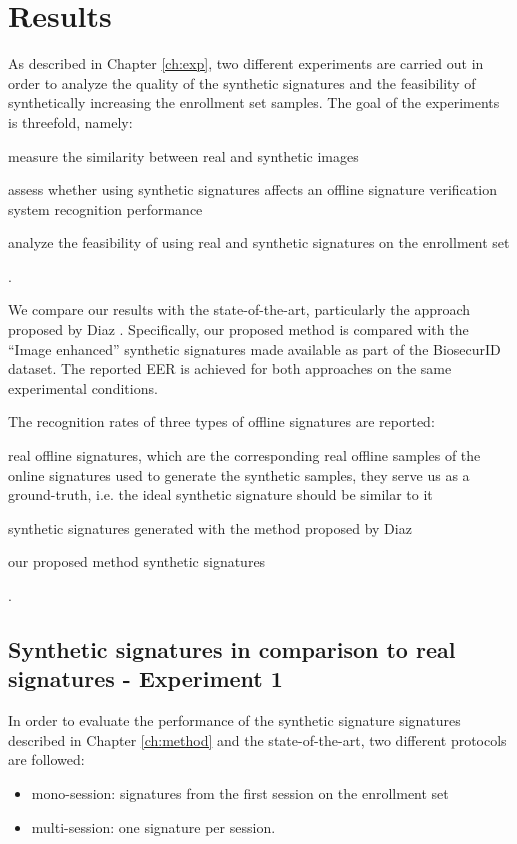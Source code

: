 
\chapter{Results} \label{ch:results}

As described in Chapter \ref{ch:exp}, two different experiments are
carried out in order to analyze the quality of the synthetic
signatures and the feasibility of synthetically increasing the
enrollment set samples. The goal of the experiments is threefold, namely:
\begin{inlinelist}
  \item measure the similarity between real
  and synthetic images
  \item assess whether using synthetic
  signatures affects an offline signature verification system recognition performance
  \item analyze the feasibility of using real and synthetic signatures
  on the enrollment set
\end{inlinelist}.

We compare our results with the state-of-the-art, particularly the approach proposed by Diaz \cite{diaz2014generation}. Specifically, our proposed method is compared with the ``Image enhanced'' synthetic signatures made available as part of the BiosecurID \cite{biosecurid} dataset. The reported EER is achieved for both approaches on the same experimental conditions.

The recognition rates of three types of offline signatures are reported: 
\begin{inlinelist}
  \item real offline signatures, which are the corresponding real offline samples of the online signatures used to generate the synthetic samples, they serve us as a ground-truth, i.e. the ideal synthetic signature should be similar to it
  \item synthetic signatures generated with the method proposed by Diaz \cite{diaz2014generation}
  \item our proposed method synthetic signatures
\end{inlinelist}.

\section{Synthetic signatures in comparison to real signatures - Experiment 1}
In order to evaluate the performance of the synthetic signature signatures described in Chapter \ref{ch:method} and the state-of-the-art, two different protocols are followed: 
\begin{itemize}
\item mono-session: signatures from the first session on the enrollment set
\item multi-session: one signature per session.
\end{itemize}


